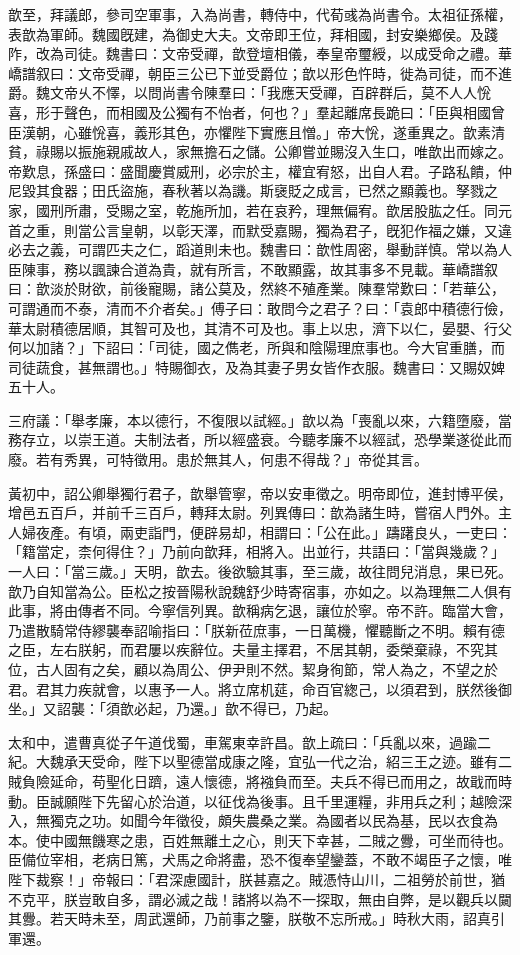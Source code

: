 \begin{pinyinscope}
歆至，拜議郎，參司空軍事，入為尚書，轉侍中，代荀彧為尚書令。太祖征孫權，表歆為軍師。魏國旣建，為御史大夫。文帝即王位，拜相國，封安樂鄉侯。及踐阼，改為司徒。魏書曰：文帝受禪，歆登壇相儀，奉皇帝璽綬，以成受命之禮。華嶠譜叙曰：文帝受禪，朝臣三公已下並受爵位；歆以形色忤時，徙為司徒，而不進爵。魏文帝乆不懌，以問尚書令陳羣曰：「我應天受禪，百辟群后，莫不人人恱喜，形于聲色，而相國及公獨有不怡者，何也？」羣起離席長跪曰：「臣與相國曾臣漢朝，心雖恱喜，義形其色，亦懼陛下實應且憎。」帝大恱，遂重異之。歆素清貧，祿賜以振施親戚故人，家無擔石之儲。公卿嘗並賜沒入生口，唯歆出而嫁之。帝歎息，孫盛曰：盛聞慶賞威刑，必宗於主，權宜宥怒，出自人君。子路私饋，仲尼毀其食器；田氏盜施，春秋著以為譏。斯襃貶之成言，已然之顯義也。孥戮之家，國刑所肅，受賜之室，乾施所加，若在哀矜，理無偏宥。歆居股肱之任。同元首之重，則當公言皇朝，以彰天澤，而默受嘉賜，獨為君子，旣犯作福之嫌，又違必去之義，可謂匹夫之仁，蹈道則未也。魏書曰：歆性周密，舉動詳慎。常以為人臣陳事，務以諷諫合道為貴，就有所言，不敢顯露，故其事多不見載。華嶠譜叙曰：歆淡於財欲，前後寵賜，諸公莫及，然終不殖產業。陳羣常歎曰：「若華公，可謂通而不泰，清而不介者矣。」傅子曰：敢問今之君子？曰：「袁郎中積德行儉，華太尉積德居順，其智可及也，其清不可及也。事上以忠，濟下以仁，晏嬰、行父何以加諸？」下詔曰：「司徒，國之儁老，所與和陰陽理庶事也。今大官重膳，而司徒蔬食，甚無謂也。」特賜御衣，及為其妻子男女皆作衣服。魏書曰：又賜奴婢五十人。

三府議：「舉孝廉，本以德行，不復限以試經。」歆以為「喪亂以來，六籍墮廢，當務存立，以崇王道。夫制法者，所以經盛衰。今聽孝廉不以經試，恐學業遂從此而廢。若有秀異，可特徵用。患於無其人，何患不得哉？」帝從其言。

黃初中，詔公卿舉獨行君子，歆舉管寧，帝以安車徵之。明帝即位，進封博平侯，增邑五百戶，并前千三百戶，轉拜太尉。列異傳曰：歆為諸生時，嘗宿人門外。主人婦夜產。有頃，兩吏詣門，便辟易却，相謂曰：「公在此。」躊躇良乆，一吏曰：「籍當定，柰何得住？」乃前向歆拜，相將入。出並行，共語曰：「當與幾歲？」一人曰：「當三歲。」天明，歆去。後欲驗其事，至三歲，故往問兒消息，果已死。歆乃自知當為公。臣松之按晉陽秋說魏舒少時寄宿事，亦如之。以為理無二人俱有此事，將由傳者不同。今寧信列異。歆稱病乞退，讓位於寧。帝不許。臨當大會，乃遣散騎常侍繆襲奉詔喻指曰：「朕新莅庶事，一日萬機，懼聽斷之不明。賴有德之臣，左右朕躬，而君屢以疾辭位。夫量主擇君，不居其朝，委榮棄祿，不究其位，古人固有之矣，顧以為周公、伊尹則不然。絜身徇節，常人為之，不望之於君。君其力疾就會，以惠予一人。將立席机莚，命百官緫己，以須君到，朕然後御坐。」又詔襲：「須歆必起，乃還。」歆不得已，乃起。

太和中，遣曹真從子午道伐蜀，車駕東幸許昌。歆上疏曰：「兵亂以來，過踰二紀。大魏承天受命，陛下以聖德當成康之隆，宜弘一代之治，紹三王之迹。雖有二賊負險延命，苟聖化日躋，遠人懷德，將襁負而至。夫兵不得已而用之，故戢而時動。臣誠願陛下先留心於治道，以征伐為後事。且千里運糧，非用兵之利；越險深入，無獨克之功。如聞今年徵役，頗失農桑之業。為國者以民為基，民以衣食為本。使中國無饑寒之患，百姓無離土之心，則天下幸甚，二賊之釁，可坐而待也。臣備位宰相，老病日篤，犬馬之命將盡，恐不復奉望鑾蓋，不敢不竭臣子之懷，唯陛下裁察！」帝報曰：「君深慮國計，朕甚嘉之。賊憑恃山川，二祖勞於前世，猶不克平，朕豈敢自多，謂必滅之哉！諸將以為不一探取，無由自弊，是以觀兵以闚其釁。若天時未至，周武還師，乃前事之鑒，朕敬不忘所戒。」時秋大雨，詔真引軍還。


\end{pinyinscope}
